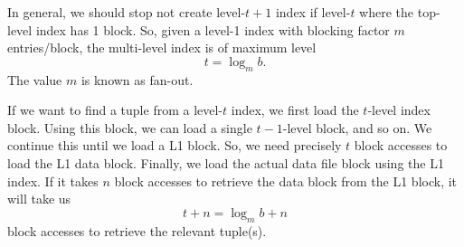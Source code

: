 \documentclass[a4paper, openany]{memoir}
\begin{document}
In general, we should stop not create level-$t+1$ index if level-$t$ where the top-level index has 1 block. So, given a level-1 index with blocking factor $m$ entries/block, the multi-level index is of maximum level
\[t = \log_m b.\]
The value $m$ is known as fan-out. 


\noindent If we want to find a tuple from a level-$t$ index, we first load the $t$-level index block. Using this block, we can load a single $t-1$-level block, and so on. We continue this until we load a L1 block. So, we need precisely $t$ block accesses to load the L1 data block. Finally, we load the actual data file block using the L1 index. If it takes $n$ block accesses to retrieve the data block from the L1 block, it will take us
\[t + n = \log_m b + n\]
block accesses to retrieve the relevant tuple(s).

\end{document}
